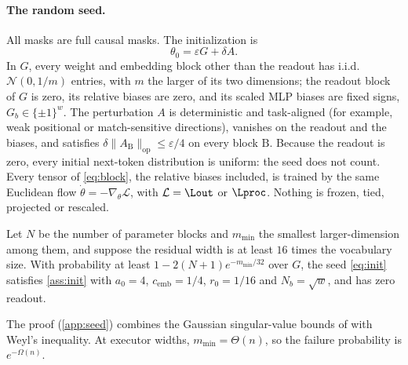 
\paragraph{The random seed.}\label{sec:seed}
All masks are full causal masks. The initialization is
\begin{equation}\label{eq:init}
\theta_0=\varepsilon G+\delta A .
\end{equation}
In $G$, every weight and embedding block other than the readout has i.i.d.\ $\mathcal N(0,1/m)$ entries, with $m$ the larger of its two dimensions; the readout block of $G$ is zero, its relative biases are zero, and its scaled MLP biases are fixed signs, $G_{b}\in\{\pm1\}^{w}$. The perturbation $A$ is deterministic and task-aligned (for example, weak positional or match-sensitive directions), vanishes on the readout and the biases, and satisfies $\delta\|A_\mathrm B\|_{\mathrm{op}}\le\varepsilon/4$ on every block $\mathrm B$. Because the readout is zero, every initial next-token distribution is uniform: the seed does not count. Every tensor of \cref{eq:block}, the relative biases included, is trained by the same Euclidean flow $\dot\theta=-\nabla_\theta\mathcal L$, with $\mathcal L=\Lout$ or $\Lproc$. Nothing is frozen, tied, projected or rescaled.

\begin{lemma}\label{lem:seed}
Let $N$ be the number of parameter blocks and $m_{\min}$ the smallest larger-dimension among them, and suppose the residual width is at least $16$ times the vocabulary size. With probability at least $1-2(N+1)e^{-m_{\min}/32}$ over $G$, the seed \cref{eq:init} satisfies \cref{ass:init} with $a_0=4$, $c_{\mathrm{emb}}=1/4$, $r_0=1/16$ and $N_b=\sqrt w$, and has zero readout.
\end{lemma}
The proof (\cref{app:seed}) combines the Gaussian singular-value bounds of \citet[Chapter~7]{vershynin2018high} with Weyl's inequality. At executor widths, $m_{\min}=\Theta(n)$, so the failure probability is $e^{-\Omega(n)}$.

